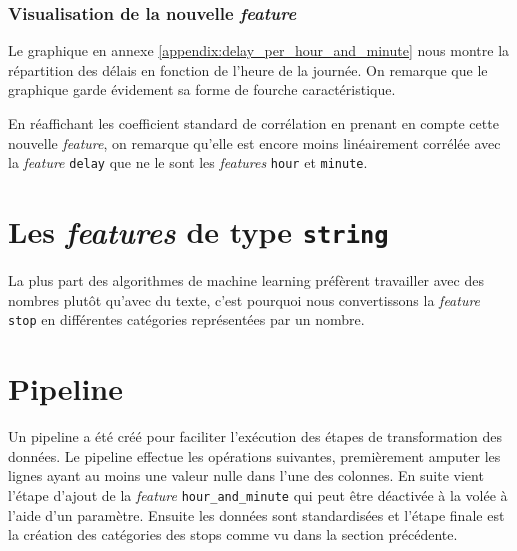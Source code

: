 \subsubsection{Visualisation de la nouvelle \textit{feature}}
Le graphique en annexe \ref{appendix:delay_per_hour_and_minute} nous montre la répartition des délais en fonction de l'heure de la journée. On remarque que le graphique garde évidement sa forme de fourche caractéristique.

En réaffichant les coefficient standard de corrélation en prenant en compte cette nouvelle \textit{feature}, on remarque qu'elle est encore moins linéairement corrélée avec la \textit{feature} \lstinline!delay! que ne le sont les \textit{features} \lstinline!hour! et \lstinline!minute!.

\section{Les \textit{features} de type \lstinline!string!}
La plus part des algorithmes de machine learning préfèrent travailler avec des nombres plutôt qu'avec du texte, c'est pourquoi nous convertissons la \textit{feature} \lstinline!stop! en différentes catégories représentées par un nombre.

\section{Pipeline}
Un pipeline a été créé pour faciliter l'exécution des étapes de transformation des données. Le pipeline effectue les opérations suivantes, premièrement amputer les lignes ayant au moins une valeur nulle dans l'une des colonnes. En suite vient l'étape d'ajout de la \textit{feature} \lstinline!hour_and_minute! qui peut être déactivée à la volée à l'aide d'un paramètre. Ensuite les données sont standardisées et l'étape finale est la création des catégories des stops comme vu dans la section précédente.